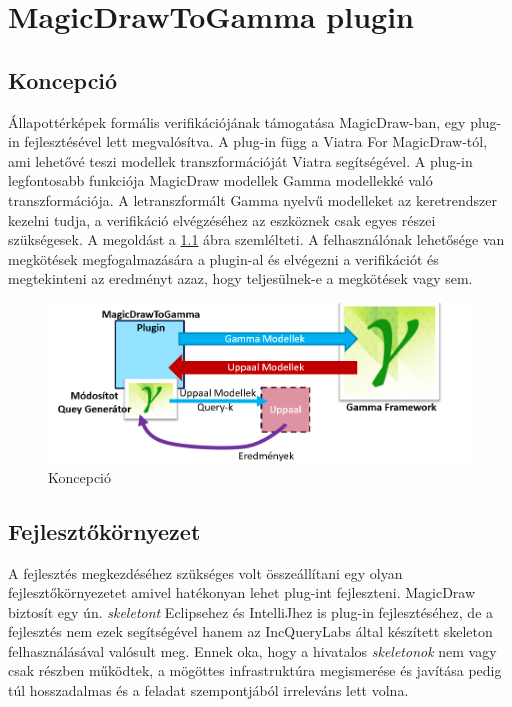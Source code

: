 \chapter{MagicDrawToGamma plugin}\label{chap:contrib}


\section{Koncepció}
Állapottérképek formális verifikációjának támogatása MagicDraw-ban, egy plug-in fejlesztésével lett megvalósítva. A plug-in függ a Viatra For MagicDraw-tól, ami lehetővé teszi modellek transzformációját Viatra segítségével. A plug-in legfontosabb funkciója MagicDraw modellek Gamma modellekké való transzformációja. A letranszformált Gamma nyelvű modelleket az keretrendszer kezelni tudja, a verifikáció elvégzéséhez az eszköznek csak egyes részei szükségesek. A megoldást a \ref{fig:used-gamma} ábra szemlélteti. A felhasználónak lehetősége van megkötések megfogalmazására a plugin-al és elvégezni a verifikációt és megtekinteni az eredményt azaz, hogy teljesülnek-e a megkötések vagy sem.

\begin{figure}[!ht]
	\centering
	\includegraphics[keepaspectratio, width=150mm]{figures/concept.png}
	\caption{Koncepció}
	\label{fig:used-gamma}
\end{figure}

\section{Fejlesztőkörnyezet}
 A fejlesztés megkezdéséhez szükséges volt összeállítani egy olyan fejlesztőkörnyezetet amivel hatékonyan lehet plug-int fejleszteni. MagicDraw biztosít egy ún. \emph{skeletont} Eclipsehez és IntelliJhez is plug-in fejlesztéséhez, de a fejlesztés nem ezek segítségével hanem az IncQueryLabs által készített skeleton felhasználásával valósult meg. Ennek oka, hogy a hivatalos \emph{skeletonok} nem vagy csak részben működtek, a mögöttes infrastruktúra megismerése és javítása pedig túl hosszadalmas és a feladat szempontjából irreleváns lett volna. 
 
